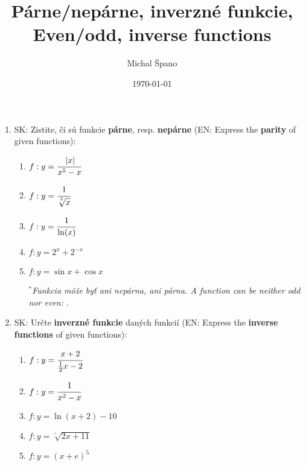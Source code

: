 \documentclass{homework}
\author{Michal Špano}
\date{\today}
\title{Párne/nepárne, inverzné funkcie,\\Even/odd, inverse functions}
\begin{document}
\maketitle

\begin{enumerate}
    \item SK: Zistite, či sú funkcie \textbf{párne}, resp. \textbf{nepárne} (EN: Express the \textbf{parity} of given functions):
    \begin{enumerate}

        \item $f:y=\cfrac{\left|x\right|}{x^{5}-x}$
        \item $f:y=\cfrac{1}{\sqrt[^3]{x}}$ 
        \item $f:y=\cfrac{1}{\ln (x)}$ 
        \item $f:y=2^{x}+2^{-x}$ 
        \item $f:y=\sin{x} + \cos{x}$ 
        
        \textit{$^{*}$}\textit{Funkcia môže byť ani nepárna, ani párna. A function can be neither odd nor even:}
        \href{https://moviecultists.com/can-a-function-be-neither-even-nor-odd}{\color{blue}{link}}.
    \end{enumerate}
    
    \item SK: Určte \textbf{inverzné funkcie} daných funkcií (EN: Express the \textbf{inverse functions} of given functions):
    \begin{enumerate}
        \item $f:y=\cfrac{x+2}{\frac{1}{2}x-2}$ 
        \item $f:y=\cfrac{1}{x^{2}-x}$
        \item $f:y=\ln (x+2)-10$
        \item $f:y=\sqrt[^5]{2x+11}$
        \item $f:y=(x+e)^{5}$
    \end{enumerate}
    
\end{enumerate}
\end{document}
